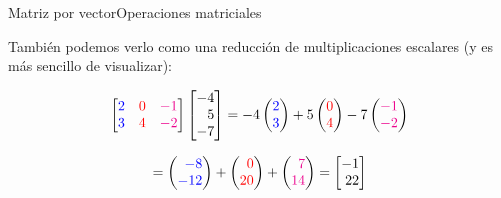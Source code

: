 \documentclass[spanish, c]{beamer}
\begin{document}
\begin{frame}{Matriz por vector}{Operaciones matriciales}
    
    También podemos verlo como una reducción de multiplicaciones escalares (y es más sencillo de visualizar):

    \bigskip

    \[%
        \begin{bmatrix*}[r]
            {\color{blue} 2} & {\color{red} 0} & {\color{magenta} -1}\\
            {\color{blue} 3} & {\color{red} 4} & {\color{magenta} -2}
        \end{bmatrix*}
        \begin{bmatrix*}[r]
            -4 \\
            5 \\
            -7
        \end{bmatrix*} =
        -4 %
        \begin{pmatrix*}[r]
            \color{blue} 2 \\ \color{blue} 3
        \end{pmatrix*}
        + 5 %
        \begin{pmatrix*}[r]
            \color{red} 0 \\ \color{red} 4
        \end{pmatrix*}
        -7 %
        \begin{pmatrix*}[r]
            \color{magenta} -1 \\ \color{magenta} -2
        \end{pmatrix*}
    \]

    \bigskip

    \[= %
        \begin{pmatrix*}[r]
            \color{blue} -8 \\ \color{blue} -12
        \end{pmatrix*}
        + %
        \begin{pmatrix*}[r]
            \color{red} 0 \\ \color{red} 20
        \end{pmatrix*}
        + %
        \begin{pmatrix*}[r]
            \color{magenta} 7 \\ \color{magenta} 14
        \end{pmatrix*}
        = %
        \begin{bmatrix*}[r]
            -1 \\ 22
        \end{bmatrix*}
    \]

\end{frame}
\end{document}
